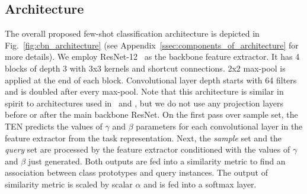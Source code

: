 \documentclass{article}
\begin{document}
\subsection{Architecture} \label{ssec:theory_architecture}

The overall proposed few-shot classification architecture is depicted in Fig.~\ref{fig:cbn_architecture} (see Appendix~\ref{ssec:components_of_architecture} for more details). We employ ResNet-12~\citep{He2016Deep} as the backbone feature extractor. It has 4 blocks of depth 3 with 3x3 kernels and shortcut connections. 2x2 max-pool is applied at the end of each block. Convolutional layer depth starts with 64 filters and is doubled after every max-pool. Note that this architecture is similar in spirit to architectures used in~\citep{Bauer2017discriminative} and \citep{munkhdalai2018rapid}, but we do not use any projection layers before or after the main backbone ResNet. On the first pass over sample set, the TEN predicts the values of $\gamma$ and $\beta$ parameters for each convolutional layer in the feature extractor from the task representation. Next, the \emph{sample} set and the \emph{query} set are processed by the feature extractor conditioned with the values of $\gamma$ and $\beta$ just generated. Both outputs are fed into a similarity metric to find an association between class prototypes and query instances. The output of similarity metric is scaled by scalar $\alpha$ and is fed into a softmax layer.
\end{document}
